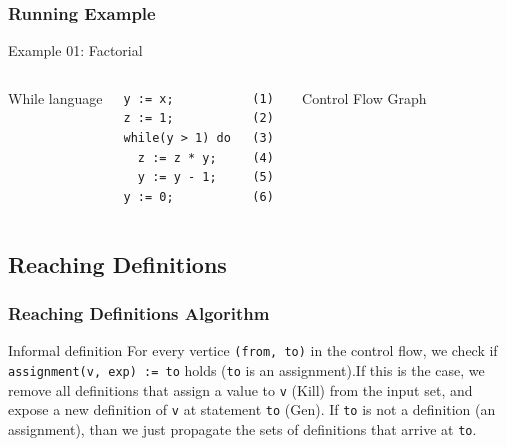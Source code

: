 \begin{frame}[fragile]
  \frametitle{Running Example}
  
  \begin{center}
  	\large Example 01: Factorial
  \end{center}
  
  \begin{columns}
While language
    
\begin{verbatim}
y := x;           (1)
z := 1;           (2)
while(y > 1) do   (3)
  z := z * y;     (4) 
  y := y - 1;     (5) 
y := 0;           (6) 
\end{verbatim}
\pause Control Flow Graph

\end{columns}
\end{frame}


\subsection{Reaching Definitions}


\begin{frame}
  \frametitle{Reaching Definitions Algorithm}

  \begin{block}{Informal definition}
   For every vertice \texttt{(from, to)} in the control flow,
   we check if \texttt{assignment(v, exp) := to} holds (\texttt{to} is
   an assignment).\pause If this is the case, we remove all definitions that
   assign a value to \texttt{v} ({\color{blue}Kill}) from the input set, and expose a new
   definition of \texttt{v} at statement \texttt{to} ({\color{blue}Gen}).
   If \texttt{to} is not a definition (an assignment), than we just propagate the
   sets of definitions that arrive at \texttt{to}.
  \end{block} 
\end{frame}

